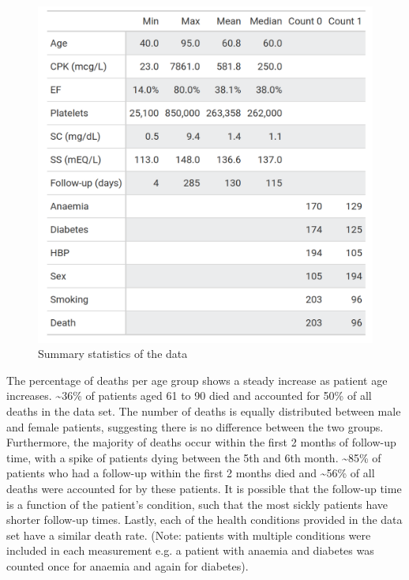 \documentclass[12pt, letterpaper]{article}
\begin{document}
	\begin{figure}[H]
		\centering
		\includegraphics[width=0.70\linewidth]{figs/variable_stats.png}
		\caption{Summary statistics of the data}
		\label{fig:sum_stats}
	\end{figure}

	
	The percentage of deaths per age group shows a steady increase as patient age increases. \textasciitilde36\% of patients aged 61 to 90 died and accounted for 50\% of all deaths in the data set. The number of deaths is equally distributed between male and female patients, suggesting there is no difference between the two groups. Furthermore, the majority of deaths occur within the first 2 months of follow-up time, with a spike of patients dying between the 5th and 6th month. \textasciitilde85\% of patients who had a follow-up within the first 2 months died and \textasciitilde56\% of all deaths were accounted for by these patients. It is possible that the follow-up time is a function of the patient's condition, such that the most sickly patients have shorter follow-up times. Lastly, each of the health conditions provided in the data set have a similar death rate. (Note: patients with multiple conditions were included in each measurement e.g. a patient with anaemia and diabetes was counted once for anaemia and again for diabetes).
	
\end{document}
